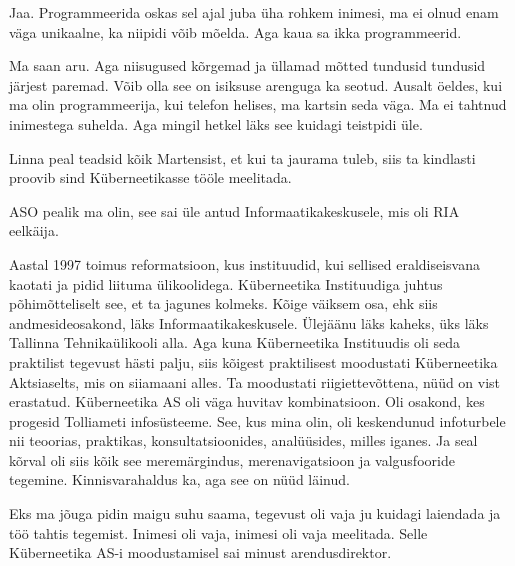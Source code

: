 Jaa. Programmeerida oskas sel ajal juba üha rohkem inimesi, ma ei olnud enam väga unikaalne, ka niipidi võib mõelda. Aga kaua sa ikka programmeerid.


Ma saan aru. Aga niisugused kõrgemad ja üllamad mõtted tundusid tundusid järjest paremad. Võib olla see on isiksuse arenguga ka seotud. Ausalt öeldes,  kui ma olin programmeerija, kui telefon helises, ma kartsin seda väga. Ma ei tahtnud inimestega suhelda. Aga mingil hetkel läks see kuidagi  teistpidi üle.

Linna peal teadsid kõik  Martensist, et  kui ta jaurama tuleb, siis ta kindlasti proovib sind  Küberneetikasse tööle meelitada. 


ASO pealik ma olin, see sai üle antud Informaatikakeskusele, mis oli RIA eelkäija. 

Aastal 1997 toimus reformatsioon, kus instituudid, kui sellised eraldiseisvana kaotati ja  pidid liituma ülikoolidega. Küberneetika Instituudiga juhtus põhimõtteliselt see, et ta jagunes kolmeks. Kõige väiksem osa, ehk siis andmesideosakond,  läks Informaatikakeskusele. Ülejäänu läks kaheks, üks läks Tallinna Tehnikaülikooli alla. Aga kuna Küberneetika Instituudis oli seda praktilist tegevust hästi palju, siis kõigest praktilisest moodustati Küberneetika Aktsiaselts, mis on siiamaani alles. Ta moodustati riigiettevõttena, nüüd on  vist erastatud. Küberneetika AS  oli väga huvitav  kombinatsioon. Oli osakond, kes progesid  Tolliameti infosüsteeme. See, kus mina olin, oli keskendunud infoturbele  nii teoorias, praktikas, konsultatsioonides, analüüsides, milles iganes. Ja seal kõrval oli siis kõik see meremärgindus,  merenavigatsioon ja valgusfooride tegemine. Kinnisvarahaldus ka, aga see on nüüd läinud. 
 

Eks ma jõuga pidin maigu suhu saama, tegevust oli vaja ju kuidagi laiendada ja töö tahtis tegemist.  Inimesi oli vaja, inimesi oli vaja meelitada. Selle Küberneetika AS-i  moodustamisel sai minust arendusdirektor. 

